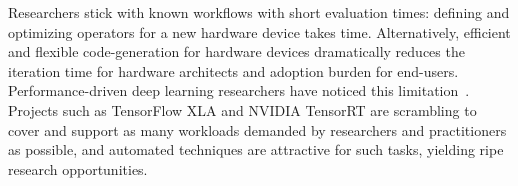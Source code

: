 Researchers stick with known workflows with short evaluation times: defining and optimizing operators for a new hardware device takes time.
Alternatively, efficient and flexible code-generation for hardware devices dramatically reduces the iteration time for hardware architects and adoption burden for end-users.
Performance-driven deep learning researchers have noticed this limitation~\cite{barham2019machine}.
Projects such as TensorFlow XLA and NVIDIA TensorRT are scrambling to cover and support as many workloads demanded by researchers and practitioners as possible, and automated techniques are attractive for such tasks, yielding ripe research opportunities.

